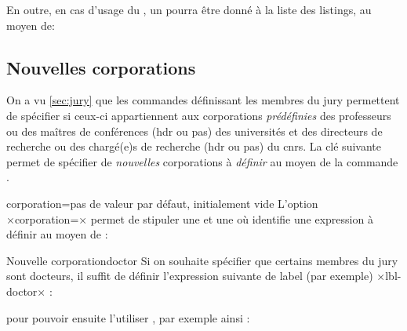 En outre, en cas d'usage du , un 
pourra être donné à la liste des listings, au moyen de:
\begin{preamblecode}[title=Par exemple dans le \File{\configurationfile}]
\renewcommand\lstlistingname{÷\meta{titre alternatif}÷}
\end{preamblecode}

\subsection{Nouvelles corporations}\label{sec:corporations}

On a vu \vref{sec:jury} que les commandes définissant les membres du jury
permettent de spécifier si ceux-ci appartiennent aux corporations
\emph{prédéfinies} des professeurs ou des maîtres de conférences (\gls{hdr} ou
pas) des universités et des directeurs de recherche ou des chargé(e)s de
recherche (\gls{hdr} ou pas) du \gls{cnrs}. La clé 
suivante permet de spécifier de \emph{nouvelles} corporations à \emph{définir}
au moyen de la commande .

\begin{docKey}{corporation}{=}{pas de
    valeur par défaut, initialement vide}
  L'option ×corporation=× permet de stipuler une  et une  où  identifie
  une expression à définir au moyen de :
\begin{preamblecode}[title=Par exemple dans le \File{\configurationfile}]
\end{preamblecode}
\end{docKey}

\begin{dbexample}{Nouvelle corporation}{doctor}
  Si on souhaite spécifier que certains membres du jury sont docteurs, il
  suffit de définir  l'expression suivante de label (par
  exemple) ×lbl-doctor× :
\begin{preamblecode}[title=Par exemple dans le \File{\configurationfile}]
\end{preamblecode}
  pour pouvoir ensuite l'utiliser , par
  exemple ainsi :
\begin{bodycode}
\end{bodycode}
\end{dbexample}

